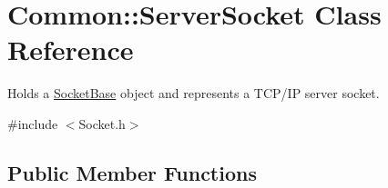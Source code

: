 \hypertarget{class_common_1_1_server_socket}{\section{Common\-:\-:Server\-Socket Class Reference}
\label{class_common_1_1_server_socket}
}


Holds a \hyperlink{class_common_1_1_socket_base}{Socket\-Base} object and represents a T\-C\-P/\-I\-P server socket.  




{\ttfamily \#include $<$Socket.\-h$>$}

\subsection*{Public Member Functions}
